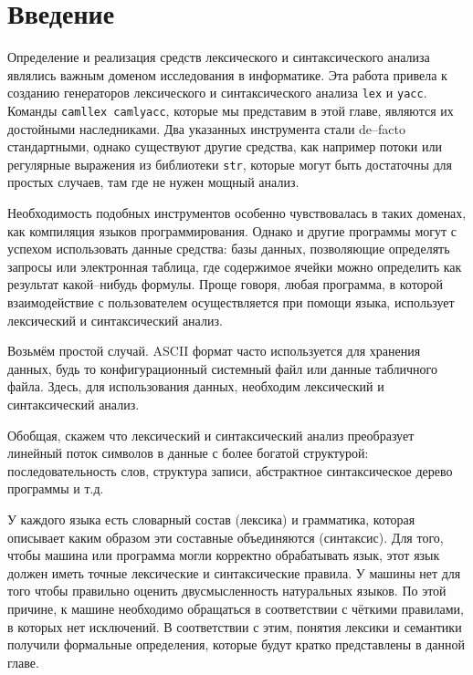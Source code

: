 \section{Введение}

Определение и реализация средств лексического и синтаксического анализа являлись
важным доменом исследования в информатике. Эта работа привела к созданию
генераторов лексического и синтаксического анализа \texttt{lex} и
\texttt{yacc}. Команды \texttt{camllex camlyacc}, которые мы представим в этой
главе, являются их достойными наследниками. Два указанных инструмента стали
de--facto стандартными, однако существуют другие средства, как например потоки
или регулярные выражения из библиотеки \texttt{str}, которые могут быть
достаточны для простых случаев, там где не нужен мощный анализ.

Необходимость подобных инструментов особенно чувствовалась в таких доменах, как
компиляция языков программирования. Однако и другие программы могут с успехом
использовать данные средства: базы данных, позволяющие определять запросы или
электронная таблица, где содержимое ячейки можно определить как результат
какой--нибудь формулы. Проще говоря, любая программа, в которой взаимодействие с
пользователем осуществляется при помощи языка, использует лексический и
синтаксический анализ.

Возьмём простой случай. ASCII формат часто используется для хранения данных,
будь то конфигурационный системный файл или данные табличного файла. Здесь, для
использования данных, необходим лексический и синтаксический анализ.

Обобщая, скажем что лексический и синтаксический анализ преобразует линейный
поток символов в данные с более богатой структурой: последовательность слов,
структура записи, абстрактное синтаксическое дерево программы и т.д.

У каждого языка есть словарный состав (лексика) и грамматика, которая описывает
каким образом эти составные объединяются (синтаксис). Для того, чтобы машина или
программа могли корректно обрабатывать язык, этот язык должен иметь точные
лексические и синтаксические правила. У машины нет  для
того чтобы правильно оценить двусмысленность натуральных языков. По этой
причине, к машине необходимо обращаться в соответствии с чёткими правилами, в
которых нет исключений. В соответствии с этим, понятия лексики и семантики
получили формальные определения, которые будут кратко представлены в данной
главе.